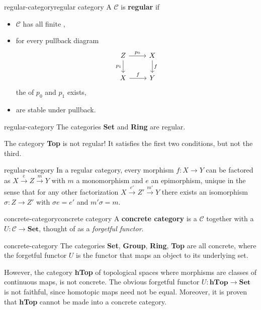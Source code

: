 \begin{topic}{regular-category}{regular category}
    A  $\mathcal{C}$ is \textbf{regular} if
    \begin{itemize}
        \item $\mathcal{C}$ has all finite ,
        \item for every pullback diagram
        \[ \begin{tikzcd} Z \arrow[swap]{d}{p_1} \arrow{r}{p_0} & X \arrow{d}{f} \\ X \arrow{r}{f} & Y \end{tikzcd} \]
        the  of $p_0$ and $p_1$ exists,
        \item {} are stable under pullback.
    \end{itemize}
\end{topic}

\begin{example}{regular-category}
    The categories \textbf{Set} and \textbf{Ring} are regular.
    
    The category \textbf{Top} is not regular! It satisfies the first two conditions, but not the third.
\end{example}

\begin{example}{regular-category}
    In a regular category, every morphism $f : X \to Y$ can be factored as $X \xrightarrow{e} Z \xrightarrow{m} Y$ with $m$ a monomorphism and $e$ an epimorphism, unique in the sense that for any other factorization $X \xrightarrow{e'} Z' \xrightarrow{m'} Y$ there exists an isomorphism $\sigma : Z \to Z'$ with $\sigma e = e'$ and $m' \sigma = m$.
\end{example}

\begin{topic}{concrete-category}{concrete category}
    A \textbf{concrete category} is a  $\mathcal{C}$ together with a  $U : \mathcal{C} \to \textbf{Set}$, thought of as a \textit{forgetful functor}.
\end{topic}

\begin{example}{concrete-category}
    The categories \textbf{Set}, \textbf{Group}, \textbf{Ring}, \textbf{Top} are all concrete, where the forgetful functor $U$ is the functor that maps an object to its underlying set.
    
    However, the category \textbf{hTop} of topological spaces where morphisms are  classes of continuous maps, is not concrete. The obvious forgetful functor $U : \textbf{hTop} \to \textbf{Set}$ is not faithful, since homotopic maps need not be equal. Moreover, it is proven that \textbf{hTop} cannot be made into a concrete category.
\end{example}

